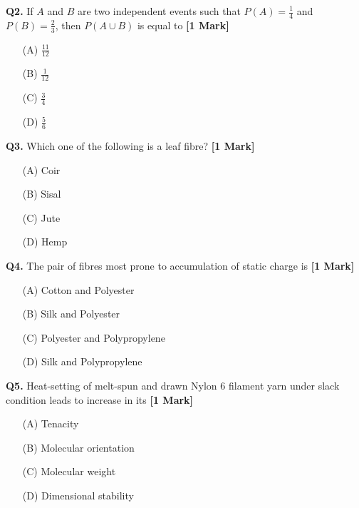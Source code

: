 \documentclass[11pt]{article}
\newcommand{\questiona}[2]{
    \noindent\textbf{Q#2.} #1 \hfill \textbf{[1 Mark]}
}
\begin{document}
\questiona{If \( A \) and \( B \) are two independent events such that \( P(A) = \frac{1}{4} \) and \( P(B) = \frac{2}{3} \), then \( P(A \cup B) \) is equal to}{2}
\begin{enumerate}
    \item[(A)] \( \frac{11}{12} \)
    \item[(B)] \( \frac{1}{12} \)
    \item[(C)] \( \frac{3}{4} \)
    \item[(D)] \( \frac{5}{6} \)
\end{enumerate}
\vspace{0.5cm}

\questiona{Which one of the following is a leaf fibre?}{3}
\begin{enumerate}
    \item[(A)] Coir
    \item[(B)] Sisal
    \item[(C)] Jute
    \item[(D)] Hemp
\end{enumerate}
\vspace{0.5cm}

\questiona{The pair of fibres most prone to accumulation of static charge is}{4}
\begin{enumerate}
    \item[(A)] Cotton and Polyester
    \item[(B)] Silk and Polyester
    \item[(C)] Polyester and Polypropylene
    \item[(D)] Silk and Polypropylene
\end{enumerate}
\vspace{0.5cm}

\questiona{Heat-setting of melt-spun and drawn Nylon 6 filament yarn under slack condition leads to increase in its}{5}
\begin{enumerate}
    \item[(A)] Tenacity
    \item[(B)] Molecular orientation
    \item[(C)] Molecular weight
    \item[(D)] Dimensional stability
\end{enumerate}
\vspace{0.5cm}
\end{document}
